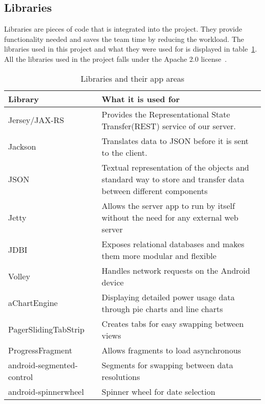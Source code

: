 \subsection{Libraries}
\label{sec:libraries}
Libraries are pieces of code that is integrated into the project. They provide functionality needed and saves the team time by reducing the workload. The libraries used in this project and what they were used for is displayed in table~\ref{tab:libs}.
 All the libraries used in the project falls under the Apache 2.0 license~\cite{apache}.

\begin{table}[H]
\begin{tabular}{|l|p{12.9cm}|}
\hline
\textbf{Library }& \textbf{What it is used for}\\\hline
Jersey/JAX-RS~\cite{jersey} & Provides the Representational State Transfer(REST) service of our server.\\\hline
Jackson~\cite{jackson}&Translates data to JSON before it is sent to the client.\\\hline
JSON~\cite{json}&Textual representation of the objects and standard way to store and transfer data between different components\\\hline
Jetty~\cite{jetty}&Allows the server app to run by itself without the need for any external web server\\\hline
JDBI~\cite{jdbi}&Exposes relational databases and makes them more modular and flexible\\\hline
Volley~\cite{volley}& Handles network requests on the Android device\\\hline
aChartEngine~\cite{achart}& Displaying detailed power usage data through  pie charts and line charts\\\hline
PagerSlidingTabStrip~\cite{psts}& Creates tabs for easy swapping between views\\\hline
ProgressFragment~\cite{progressfragment}& Allows fragments to load asynchronous\\\hline
android-segmented-control~\cite{segments}& Segments for swapping between data resolutions\\\hline
android-spinnerwheel\cite{spinnerwheel}& Spinner wheel for date selection\\\hline
\end{tabular}
\caption{Libraries and their app areas}
\label{tab:libs}
\end{table}

